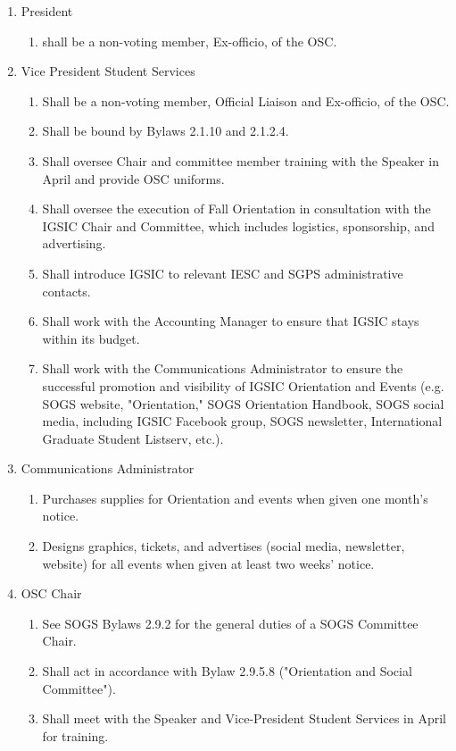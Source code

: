 \begin{enumerate}[label*=\arabic*., align=left]
\begin{enumerate}[label*=\arabic*., align=left]	
\item President
\begin{enumerate}
\item shall be a non-voting member, Ex-officio, of the OSC.
\end{enumerate}
\item Vice President Student Services
\begin{enumerate}
\item Shall be a non-voting member, Official Liaison and Ex-officio, of the OSC.
\item Shall be bound by Bylaws 2.1.10 and 2.1.2.4.
\item Shall oversee Chair and committee member training with the Speaker in April and provide OSC uniforms.
\item Shall oversee the execution of Fall Orientation in consultation with the IGSIC Chair and Committee, which includes logistics, sponsorship, and advertising.
\item Shall introduce IGSIC to relevant IESC and SGPS administrative contacts.
\item Shall work with the Accounting Manager to ensure that IGSIC stays within its budget.
\item Shall work with the Communications Administrator to ensure the successful
promotion and visibility of IGSIC Orientation and Events (e.g. SOGS website, "Orientation," SOGS Orientation Handbook, SOGS social media, including IGSIC Facebook group, SOGS newsletter, International Graduate Student Listserv, etc.).
\end{enumerate}
\item Communications Administrator
\begin{enumerate}
\item Purchases supplies for Orientation and events when given one month's notice.
\item Designs graphics, tickets, and advertises (social media, newsletter, website) for all events when given at least two weeks' notice.
\end{enumerate}
\item OSC Chair
\begin{enumerate}
\item See SOGS Bylaws 2.9.2 for the general duties of a SOGS Committee Chair.
\item Shall act in accordance with Bylaw 2.9.5.8 ("Orientation and Social Committee").
\item Shall meet with the Speaker and Vice-President Student Services in April for training.

\end{enumerate}
\end{enumerate}
\end{enumerate}
